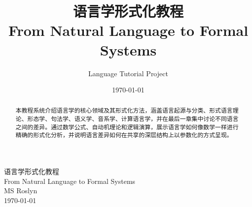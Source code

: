 \documentclass[12pt,a4paper]{ctexart}
\title{\huge 语言学形式化教程\\ \large From Natural Language to Formal Systems}
\author{Language Tutorial Project}
\date{\today}
\begin{document}
\clearpage
\vspace*{\fill}

\begin{center}
{\huge 语言学形式化教程}\\[0.8em]
{\large From Natural Language to Formal Systems}\\[2.5em]
{\large MS Roslyn}\\[0.6em]
{\large \today}
\end{center}

\vspace{2.5em}

\begin{abstract}
\centering
本教程系统介绍语言学的核心领域及其形式化方法，涵盖语言起源与分类、形式语言理论、形态学、句法学、语义学、音系学、计算语言学，并在最后一章集中讨论不同语言之间的差异。通过数学公式、自动机理论和逻辑演算，展示语言学如何像数学一样进行精确的形式化分析，并说明语言差异如何在共享的深层结构上以参数化的方式呈现。
\end{abstract}

\vspace*{\fill}
\clearpage

\tableofcontents
\clearpage


\newpage

\newpage

\newpage

\newpage

\newpage

\newpage

\newpage

\newpage

\end{document}
